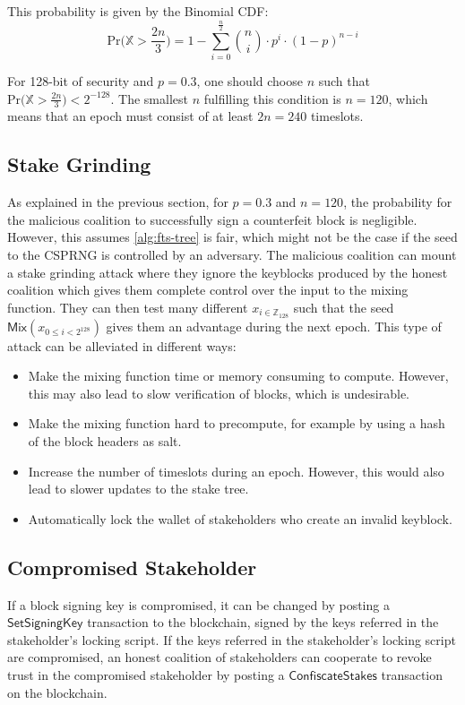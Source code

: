 \documentclass{style/kththesis}
\begin{document}
This probability is given by the Binomial CDF:
\begin{equation}
\label{equ:binom-cdf}
\text{Pr}\Bigg( \mathbb{X} > \frac{2n}{3} \Bigg) = 1 - \sum_{i = 0}^{\frac{n}{2}}{{\binom{n}{i}} \cdot p^i \cdot (1 - p)^{n - i}} %
\end{equation}

For 128-bit of security and $p = 0.3$, one should choose $n$ such that $\text{Pr}\Big( \mathbb{X} > \frac{2n}{3} \Big) < 2^{-128}$. The smallest $n$ fulfilling this condition is $n = 120$, which means that an epoch must consist of at least $2n = 240$ timeslots.

\subsection{Stake Grinding}
As explained in the previous section, for $p = 0.3$ and $n = 120$, the probability for the malicious coalition to successfully sign a counterfeit block is negligible. However, this assumes \cref{alg:fts-tree} is fair, which might not be the case if the seed to the CSPRNG is controlled by an adversary. The malicious coalition can mount a stake grinding attack where they ignore the keyblocks produced by the honest coalition which gives them complete control over the input to the mixing function. They can then test many different $x_{i \in \mathbb{Z}_{128}}$ such that the seed $\mathsf{Mix}(x_{0 \le i < 2^{128}})$ gives them an advantage during the next epoch. This type of attack can be alleviated in different ways:
\begin{itemize}
    \item Make the mixing function time or memory consuming to compute. However, this may also lead to slow verification of blocks, which is undesirable.
    \item Make the mixing function hard to precompute, for example by using a hash of the block headers as salt.
    \item Increase the number of timeslots during an epoch. However, this would also lead to slower updates to the stake tree.
    \item Automatically lock the wallet of stakeholders who create an invalid keyblock.
\end{itemize}

\subsection{Compromised Stakeholder}
If a block signing key is compromised, it can be changed by posting a $\mathsf{SetSigningKey}$ transaction to the blockchain, signed by the keys referred in the stakeholder's locking script. If the keys referred in the stakeholder's locking script are compromised, an honest coalition of stakeholders can cooperate to revoke trust in the compromised stakeholder by posting a $\mathsf{ConfiscateStakes}$ transaction on the blockchain.
\end{document}
